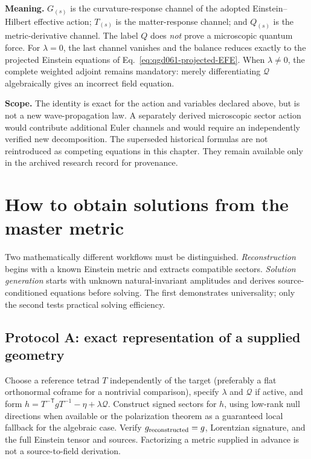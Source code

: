 \documentclass[11pt,a4paper]{article}
\begin{document}
\noindent\textbf{Meaning.} $G_{(s)}$ is the curvature-response
channel of the adopted Einstein--Hilbert effective action;
$T_{(s)}$ is the matter-response channel; and $Q_{(s)}$ is the
metric-derivative channel. The label $Q$ does \emph{not} prove a
microscopic quantum force. For $\lambda=0$, the last channel vanishes
and the balance reduces exactly to the projected Einstein equations
of Eq.~\eqref{eq:qgd061-projected-EFE}. When $\lambda\ne0$, the
complete weighted adjoint remains mandatory: merely differentiating
$\mathcal Q$ algebraically gives an incorrect field equation.

\noindent\textbf{Scope.} The identity is exact for the action and
variables declared above, but is not a new wave-propagation law.
A separately derived microscopic sector action would contribute
additional Euler channels and would require an independently verified
new decomposition. The superseded historical formulas are not
reintroduced as competing equations in this chapter. They remain
available only in the archived research record for provenance.


\section{How to obtain solutions from the master metric}\label{sec:solution-procedure}
Two mathematically different workflows must be distinguished. \emph{Reconstruction} begins with a known Einstein metric and extracts compatible sectors. \emph{Solution generation} starts with unknown natural-invariant amplitudes and derives source-conditioned equations before solving. The first demonstrates universality; only the second tests practical solving efficiency.

\subsection{Protocol A: exact representation of a supplied geometry}
Choose a reference tetrad \(T\) independently of the target (preferably a flat orthonormal coframe for a nontrivial comparison), specify \(\lambda\) and \(\mathcal Q\) if active, and form \(h=T^{-\mathsf T}gT^{-1}-\eta+\lambda\mathcal Q\). Construct signed sectors for \(h\), using low-rank null directions when available or the polarization theorem as a guaranteed local fallback for the algebraic case. Verify \(g_{\rm reconstructed}=g\), Lorentzian signature, and the full Einstein tensor and sources. Factorizing a metric supplied in advance is not a source-to-field derivation.
\end{document}
